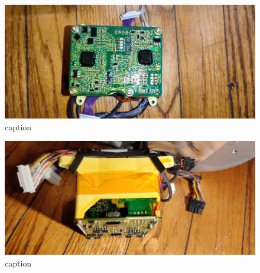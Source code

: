 \documentclass[]{formalLabReport}
\begin{document}
\begin{figure}
    \includegraphics[]{segwayGyroCubeBottom.jpg}
    \caption{caption}
    \label{fig:segwayGyroCubeBottom.jpg}
\end{figure}

\begin{figure}
    \includegraphics[]{segwayGyroCubeSide.jpg}
    \caption{caption}
    \label{fig:segwayGyroCubeSide.jpg}
\end{figure}
\end{document}
